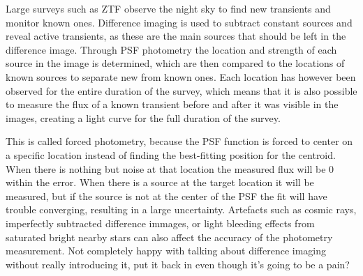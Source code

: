 \documentclass[a4paper,oneside,12pt, class=Latex/Classes/PhDthesisPSnPDF, crop=false]{standalone}
\begin{document}

Large surveys such as ZTF observe the night sky to find new transients and monitor known ones. Difference imaging is used to subtract constant sources and reveal active transients, as these are the main sources that should be left in the difference image. Through PSF photometry the location and strength of each source in the image is determined, which are then compared to the locations of known sources to separate new from known ones. Each location has however been observed for the entire duration of the survey, which means that it is also possible to measure the flux of a known transient before and after it was visible in the images, creating a light curve for the full duration of the survey.

This is called forced photometry, because the PSF function is forced to center on a specific location instead of finding the best-fitting position for the centroid. When there is nothing but noise at that location the measured flux will be 0 within the error. When there is a source at the target location it will be measured, but if the source is not at the center of the PSF the fit will have trouble converging, resulting in a large uncertainty. Artefacts such as cosmic rays, imperfectly subtracted difference immages, or light bleeding effects from saturated bright nearby stars can also affect the accuracy of the photometry measurement. \color{red} Not completely happy with talking about difference imaging without really introducing it, put it back in even though it's going to be a pain? \color{black}


\end{document}
